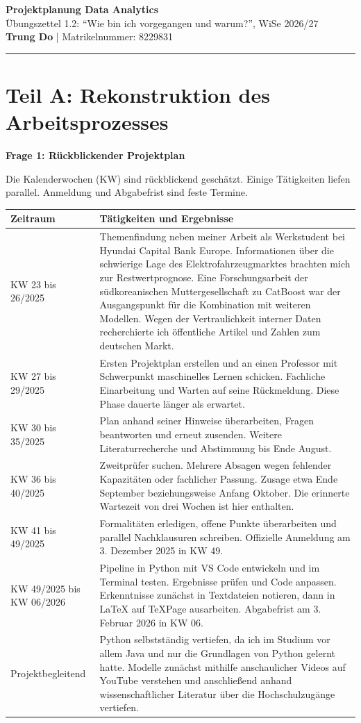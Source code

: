 \documentclass[a4paper,10pt]{article}
\begin{document}
\pagestyle{empty}
\fontsize{9}{10.5}\selectfont
\begin{center}
\textbf{\large Projektplanung Data Analytics}\\[1pt]
Übungszettel 1.2: \enquote{Wie bin ich vorgegangen und warum?}, WiSe 2026/27\\
\textbf{Trung Do} | Matrikelnummer: 8229831
\end{center}
\noindent\rule{\textwidth}{0.3pt}

\section*{Teil A: Rekonstruktion des Arbeitsprozesses}
\textbf{Frage 1: Rückblickender Projektplan}

Die Kalenderwochen (KW) sind rückblickend geschätzt. Einige Tätigkeiten liefen parallel. Anmeldung und Abgabefrist sind feste Termine.

\begin{tabularx}{\textwidth}{@{}p{2.8cm}X@{}}
\hline
\textbf{Zeitraum} & \textbf{Tätigkeiten und Ergebnisse}\\
\hline
KW 23 bis 26/2025 & Themenfindung neben meiner Arbeit als Werkstudent bei Hyundai Capital Bank Europe. Informationen über die schwierige Lage des Elektrofahrzeugmarktes brachten mich zur Restwertprognose. Eine Forschungsarbeit der südkoreanischen Muttergesellschaft zu CatBoost war der Ausgangspunkt für die Kombination mit weiteren Modellen. Wegen der Vertraulichkeit interner Daten recherchierte ich öffentliche Artikel und Zahlen zum deutschen Markt.\\
KW 27 bis 29/2025 & Ersten Projektplan erstellen und an einen Professor mit Schwerpunkt maschinelles Lernen schicken. Fachliche Einarbeitung und Warten auf seine Rückmeldung. Diese Phase dauerte länger als erwartet.\\
KW 30 bis 35/2025 & Plan anhand seiner Hinweise überarbeiten, Fragen beantworten und erneut zusenden. Weitere Literaturrecherche und Abstimmung bis Ende August.\\
KW 36 bis 40/2025 & Zweitprüfer suchen. Mehrere Absagen wegen fehlender Kapazitäten oder fachlicher Passung. Zusage etwa Ende September beziehungsweise Anfang Oktober. Die erinnerte Wartezeit von drei Wochen ist hier enthalten.\\
KW 41 bis 49/2025 & Formalitäten erledigen, offene Punkte überarbeiten und parallel Nachklausuren schreiben. Offizielle Anmeldung am 3. Dezember 2025 in KW 49.\\
KW 49/2025 bis KW 06/2026 & Pipeline in Python mit VS Code entwickeln und im Terminal testen. Ergebnisse prüfen und Code anpassen. Erkenntnisse zunächst in Textdateien notieren, dann in LaTeX auf TeXPage ausarbeiten. Abgabefrist am 3. Februar 2026 in KW 06.\\
Projektbegleitend & Python selbstständig vertiefen, da ich im Studium vor allem Java und nur die Grundlagen von Python gelernt hatte. Modelle zunächst mithilfe anschaulicher Videos auf YouTube verstehen und anschließend anhand wissenschaftlicher Literatur über die Hochschulzugänge vertiefen.\\
\hline
\end{tabularx}
\end{document}
